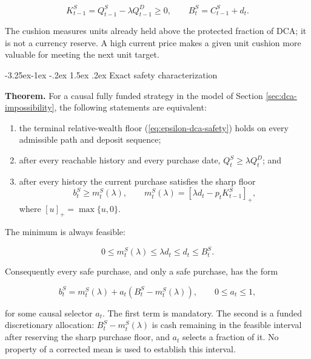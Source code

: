 \documentclass[12pt,a4paper,oneside]{report}
\makeatletter
\renewcommand\subsection{\@startsection{subsection}{2}{\z@}%
  {-3.25ex\@plus -1ex \@minus -.2ex}%
  {1.5ex \@plus .2ex}%
  {\normalfont\fontsize{12}{15}\selectfont\bfseries}}
\makeatother
\begin{document}
\begin{equation}
  K_{t-1}^S=Q_{t-1}^S-\lambda Q_{t-1}^D\geq0,
  \qquad
  B_t^S=C_{t-1}^S+d_t.
  \label{eq:guardrail-state}
\end{equation}

The cushion measures units already held above the protected fraction of DCA;
it is not a currency reserve. A high current price makes a given unit cushion
more valuable for meeting the next unit target.

\subsection{Exact safety characterization}
\label{thm:epsilon-guardrail}

\textbf{Theorem.} For a causal fully funded strategy in the model of Section
\ref{sec:dca-impossibility}, the following statements are equivalent:

\begin{enumerate}
  \item the terminal relative-wealth floor
  (\ref{eq:epsilon-dca-safety}) holds on every admissible path and deposit
  sequence;
  \item after every reachable history and every purchase date,
  $Q_t^S\geq\lambda Q_t^D$; and
  \item after every history the current purchase satisfies the sharp floor
  \begin{equation}
    b_t^S\geq m_t^S(\lambda),\qquad
    m_t^S(\lambda)=\left[\lambda d_t-p_tK_{t-1}^S\right]_+,
    \label{eq:guardrail-floor}
  \end{equation}
  where $[u]_+=\max\{u,0\}$.
\end{enumerate}

The minimum is always feasible:

\begin{equation}
  0\leq m_t^S(\lambda)\leq\lambda d_t\leq d_t\leq B_t^S.
  \label{eq:guardrail-feasibility}
\end{equation}

Consequently every safe purchase, and only a safe purchase, has the form

\begin{equation}
  b_t^S=m_t^S(\lambda)+a_t\left(B_t^S-m_t^S(\lambda)\right),
  \qquad 0\leq a_t\leq1,
  \label{eq:guardrail-interface}
\end{equation}

for some causal selector $a_t$. The first term is mandatory. The second is a
funded discretionary allocation: $B_t^S-m_t^S(\lambda)$ is cash remaining in
the feasible interval after reserving the sharp purchase floor, and $a_t$
selects a fraction of it. No property of a corrected mean is used to establish
this interval.
\end{document}
